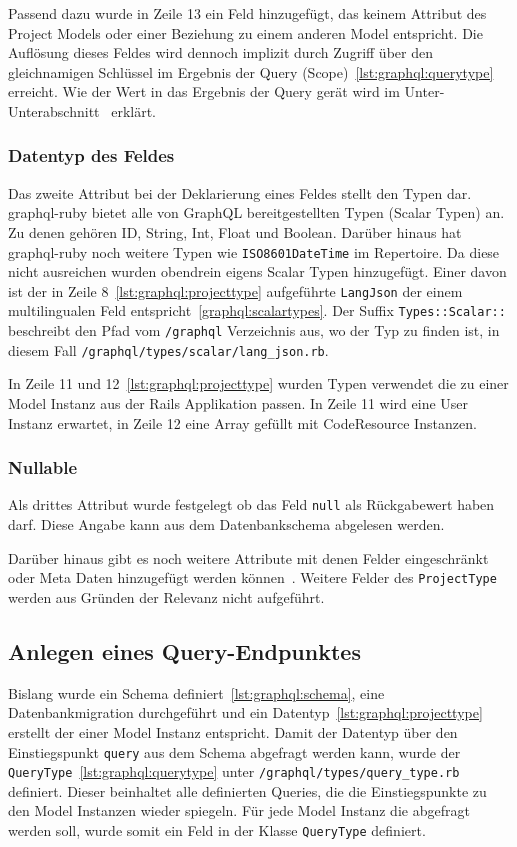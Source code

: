 Passend dazu wurde in Zeile 13 ein Feld hinzugefügt, das keinem Attribut des Project Models oder einer Beziehung zu einem anderen Model entspricht. Die Auflösung dieses Feldes wird dennoch implizit durch Zugriff über den gleichnamigen Schlüssel im Ergebnis der Query (Scope)~\ref{lst:graphql:querytype} erreicht. Wie der Wert in das Ergebnis der Query gerät wird im Unter-Unterabschnitt~ erklärt.

\subsubsection{Datentyp des Feldes}
Das zweite Attribut bei der Deklarierung eines Feldes stellt den Typen dar. graphql-ruby bietet alle von GraphQL bereitgestellten Typen (Scalar Typen) an. Zu denen gehören ID, String, Int, Float und Boolean. Darüber hinaus hat graphql-ruby noch weitere Typen wie \lstinline|ISO8601DateTime| im Repertoire. Da diese nicht ausreichen wurden obendrein eigens Scalar Typen hinzugefügt. Einer davon ist der in Zeile 8~\ref{lst:graphql:projecttype} aufgeführte \lstinline|LangJson| der einem multilingualen Feld entspricht~\ref{graphql:scalartypes}. Der Suffix \lstinline|Types::Scalar::| beschreibt den Pfad vom \lstinline|/graphql| Verzeichnis aus, wo der Typ zu finden ist, in diesem Fall \lstinline|/graphql/types/scalar/lang_json.rb|.

In Zeile 11 und 12~\ref{lst:graphql:projecttype} wurden Typen verwendet die zu einer Model Instanz aus der Rails Applikation passen. In Zeile 11 wird eine User Instanz erwartet, in Zeile 12 eine Array gefüllt mit CodeResource Instanzen.

\subsubsection{Nullable}
Als drittes Attribut wurde festgelegt ob das Feld \lstinline|null| als Rückgabewert haben darf. Diese Angabe kann aus dem Datenbankschema abgelesen werden.

Darüber hinaus gibt es noch  weitere Attribute mit denen Felder eingeschränkt oder Meta Daten hinzugefügt werden können~\cite{graphql-field-introduction}.
Weitere Felder des \lstinline|ProjectType| werden aus Gründen der Relevanz nicht aufgeführt. 

\subsection{Anlegen eines Query-Endpunktes}
\label{graphql:querytypes}
Bislang wurde ein Schema definiert~\ref{lst:graphql:schema}, eine Datenbankmigration durchgeführt und ein Datentyp~\ref{lst:graphql:projecttype} erstellt der einer Model Instanz entspricht. Damit der Datentyp über den Einstiegspunkt \lstinline|query| aus dem Schema abgefragt werden kann, wurde der \lstinline|QueryType|~\ref{lst:graphql:querytype} unter \lstinline|/graphql/types/query_type.rb| definiert.
Dieser beinhaltet alle definierten Queries, die die Einstiegspunkte zu den Model Instanzen wieder spiegeln. Für jede Model Instanz die abgefragt werden soll, wurde somit ein Feld in der Klasse \lstinline|QueryType| definiert.

